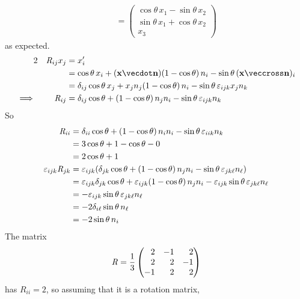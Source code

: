 \documentclass[fleqn,a4paper,11pt]{article}
\begin{document}
\begin{enumerate}[label=\textbf{\arabic*.}]
\begin{alignat*}
     && &=
      \begin{pmatrix}
       \cos\theta\,x_1 - \sin\theta\,x_2 \\
       \sin\theta\,x_1 + \cos\theta\,x_2 \\
       x_3
      \end{pmatrix}
    \end{alignat*}
    as expected.
    \begin{alignat*}2
     && \mat R_{ij} x_j &= x_i' \\
     && &= \cos\theta\,x_i + (\vec x \vecdot \vec n)(1 - \cos\theta)\,n_i
           - \sin\theta\,(\vec x \veccross \vec n)_i \\
     && &= \delta_{ij} \cos\theta\,x_j + x_j n_j (1 - \cos\theta)\,n_i
           - \sin\theta\,\epsilon_{ijk}x_j n_k \\
     \implies{}&&
      \mat R_{ij} &= \delta_{ij} \cos\theta + (1 - \cos\theta)\,n_j n_i
                     - \sin\theta\,\epsilon_{ijk}n_k
    \end{alignat*}
    So
    \begin{align*}
     \mathit{R}_{ii} &= \delta_{ii} \cos\theta + (1 - \cos\theta)\,n_i n_i
                    - \sin\theta\,\varepsilon_{iik}n_k \\
      &= 3\cos \theta + 1 - \cos \theta - 0 \\
      &= 2 \cos \theta + 1 \\
     \varepsilon_{ijk} \mathit{R}_{jk}
      &= \varepsilon_{ijk} (\delta_{jk} \cos \theta + (1 - \cos \theta)\,n_j n_i
                         - \sin\theta\,\varepsilon_{jk\ell} n_\ell) \\
      &= \varepsilon_{ijk} \delta_{jk} \cos \theta +
          \varepsilon_{ijk} (1 - \cos \theta)\,n_j n_i -
          \varepsilon_{ijk} \sin\theta\,\varepsilon_{jk\ell} n_\ell \\
      &= - \varepsilon_{ijk} \sin\theta\,\varepsilon_{jk\ell} n_\ell \\
      &= - 2\delta_{i\ell} \sin\theta\,n_\ell \\
      &= - 2 \sin\theta\,n_i
    \end{align*}
    The matrix
    \begin{equation*}
     \mat R = \frac 13
     \begin{pmatrix*}[r]
      2 & -1 & 2 \\
      2 & 2 & -1 \\
      -1 & 2 & 2
     \end{pmatrix*}
    \end{equation*}
    has \(R_{ii} = 2\), so assuming that it is a rotation matrix,

\end{enumerate}
\end{document}

